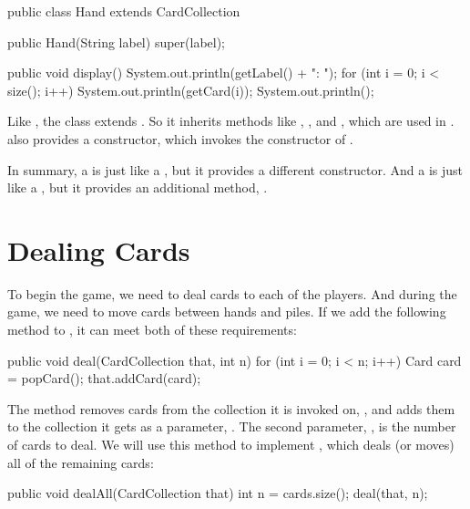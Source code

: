 
\begin{code}
public class Hand extends CardCollection {

    public Hand(String label) {
        super(label);
    }

    public void display() {
        System.out.println(getLabel() + ": ");
        for (int i = 0; i < size(); i++) {
            System.out.println(getCard(i));
        }
        System.out.println();
    }
}
\end{code}

Like , the  class extends .
So it inherits methods like , , and , which are used in .
 also provides a constructor, which invokes the constructor of .

In summary, a  is just like a , but it provides a different constructor.
And a  is just like a , but it provides an additional method, .



\section{Dealing Cards}
\label{dealing}

To begin the game, we need to deal cards to each of the players.
And during the game, we need to move cards between hands and piles.
If we add the following method to , it can meet both of these requirements:

\begin{code}
public void deal(CardCollection that, int n) {
    for (int i = 0; i < n; i++) {
        Card card = popCard();
        that.addCard(card);
    }
}
\end{code}

The  method removes cards from the collection it is invoked on, , and adds them to the collection it gets as a parameter, .
The second parameter, , is the number of cards to deal.
We will use this method to implement , which deals (or moves) all of the remaining cards:

\begin{code}
public void dealAll(CardCollection that) {
    int n = cards.size();
    deal(that, n);
}
\end{code}

